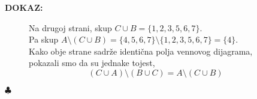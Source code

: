 \documentclass{article}
\newenvironment{dokaz}
    {\noindent\textbf{DOKAZ:}\\} {\hfill $\clubsuit$}
\begin{document}
\begin{dokaz}
\begin{figure}[h]
\begin{minipage}{10.5cm}
            Na drugoj strani, skup $C\cup B=\{1, 2, 3, 5, 6, 7\}$.\\
            Pa skup $A\setminus (C\cup B)=\{4, 5, 6, 7\}\setminus \{1, 2, 3, 5, 6, 7\}=\{4\}$.\\

            Kako obje strane sadrže identična polja vennovog dijagrama, pokazali smo da su jednake tojest,
            $$(C\cup A)\setminus (B\cup C)=A\setminus (C\cup B)$$
        \end{minipage}
        \end{figure}
\end{dokaz}
\end{document}
